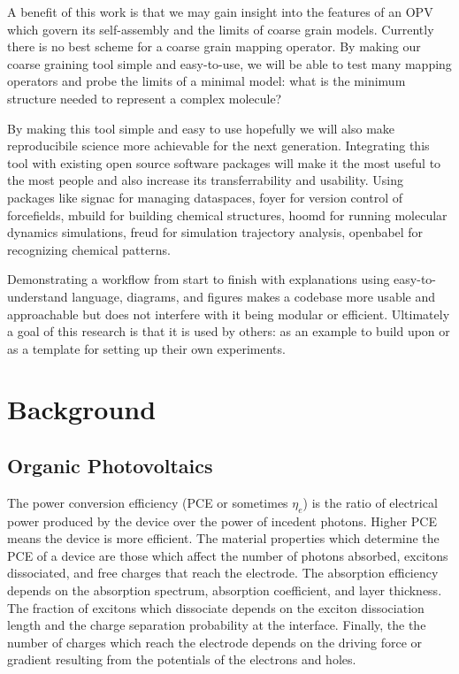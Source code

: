 A benefit of this work is that we may gain insight into the features of an OPV which govern its self-assembly and the limits of coarse grain models.
Currently there is no best scheme for a coarse grain mapping operator.
By making our coarse graining tool simple and easy-to-use, we will be able to test many mapping operators and probe the limits of a minimal model: what is the minimum structure needed to represent a complex molecule?

By making this tool simple and easy to use hopefully we will also make reproducibile science more achievable for the next generation. 
Integrating this tool with existing open source software packages will make it the most useful to the most people and also increase its transferrability and usability.
Using packages like signac for managing dataspaces, foyer for version control of forcefields, mbuild for building chemical structures, hoomd for running molecular dynamics simulations, freud for simulation trajectory analysis, openbabel for recognizing chemical patterns.

Demonstrating a workflow from start to finish with explanations using easy-to-understand language, diagrams, and figures makes a codebase more usable and approachable but does not interfere with it being modular or efficient.
Ultimately a goal of this research is that it is used by others: as an example to build upon or as a template for setting up their own experiments.

\section*{Background}

\subsection*{Organic Photovoltaics}

The power conversion efficiency (PCE or sometimes $\eta_{e}$) is the ratio of electrical power produced by the device over the power of incedent photons.
Higher PCE means the device is more efficient.  
The material properties which determine the PCE of a device are those which affect the number of photons absorbed, excitons dissociated, and free charges that reach the electrode.
The absorption efficiency depends on the absorption spectrum, absorption coefficient, and layer thickness.
The fraction of excitons which dissociate depends on the exciton dissociation length and the charge separation probability at the interface.
Finally, the the number of charges which reach the electrode depends on the driving force or gradient resulting from the potentials of the electrons and holes.\cite{Hoppe2004}

